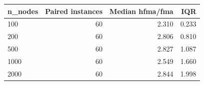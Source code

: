 \begin{tabular}{lrrr}
\toprule
n\_nodes & Paired instances & Median hfma/fma & IQR \\
\midrule
100 & 60 & 2.310 & 0.233 \\
200 & 60 & 2.806 & 0.810 \\
500 & 60 & 2.827 & 1.087 \\
1000 & 60 & 2.549 & 1.660 \\
2000 & 60 & 2.844 & 1.998 \\
\bottomrule
\end{tabular}
